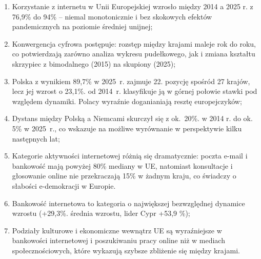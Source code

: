 \documentclass[12pt]{article}
\begin{document}
\begin{enumerate}
    \item Korzystanie z internetu w Unii Europejskiej wzrosło między 2014 a 2025 r. z 76,9\% do 94\% – niemal monotonicznie i bez skokowych 
    efektów pandemicznych na poziomie średniej unijnej;
    \item Konwergencja cyfrowa postępuje: rozstęp między krajami maleje rok do roku, co potwierdzają zarówno analiza wykresu pudełkowego,
    jak i zmiana kształtu skrzypiec z bimodalnego (2015) na skupiony (2025);
    \item Polska z wynikiem 89,7\% w 2025~r. zajmuje 22. pozycję spośród 27 krajów, lecz jej wzrost o 23,1\%. od 2014~r. klasyfikuje ją w górnej
    połowie stawki pod względem dynamiki. Polacy wyraźnie doganianiają resztę europejczyków;
    \item Dystans między Polską a Niemcami skurczył się z ok.~20\%. w 2014 r. do ok. 5\% w 2025~r., co wskazuje na możliwe wyrównanie w
    perspektywie kilku następnych lat;
    \item Kategorie aktywności internetowej różnią się dramatycznie: poczta e-mail i bankowość mają powyżej 80\% mediany w UE,
    natomiast konsultacje i głosowanie online nie przekraczają 15\% w żadnym kraju, co świadczy o słabości e-demokracji w Europie.
    \item Bankowość internetowa to kategoria o największej bezwzględnej dynamice wzrostu (+29,3\%. średnia wzrostu, lider Cypr +53,9 \%);
    \item Podziały kulturowe i ekonomiczne wewnątrz UE są wyraźniejsze w bankowości internetowej i poszukiwaniu pracy online niż w 
    mediach społecznościowych, które wykazują szybsze zbliżenie się między krajami.
\end{enumerate}
\end{document}
